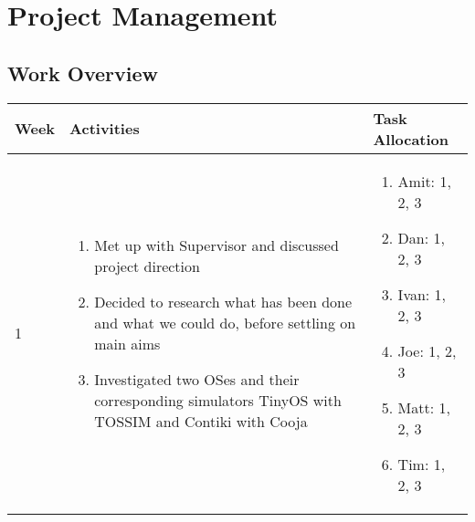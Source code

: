 \section{Project Management}

\subsection{Work Overview}

\begin{center}
	\begin{longtable}{| l | p{7.5cm} | p{5cm} |}
	Week & Activities & Task Allocation\\
	\hline
	1 & \begin{enumerate}
			\item Met up with Supervisor and discussed project direction
			\item Decided to research what has been done and what we could do, before settling on main aims
			\item Investigated two OSes and their corresponding simulators TinyOS with TOSSIM and Contiki with Cooja
		\end{enumerate} &
	\begin{enumerate}
		\item[] Amit: 1, 2, 3
		\item[] Dan: 1, 2, 3
		\item[] Ivan: 1, 2, 3
		\item[] Joe: 1, 2, 3
		\item[] Matt: 1, 2, 3
		\item[] Tim: 1, 2, 3
	\end{enumerate}
	\\ \hline


\end{longtable}
\end{center}
